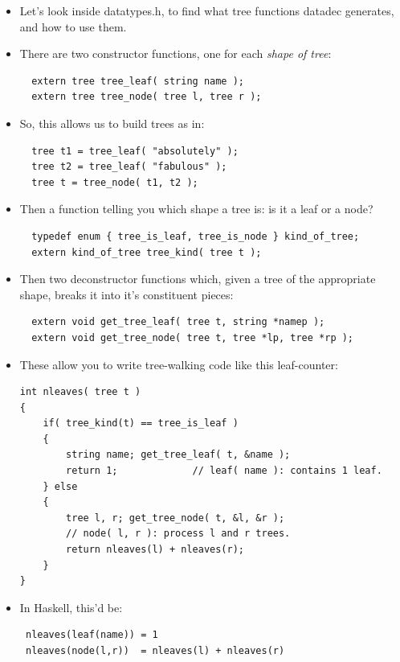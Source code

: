 \documentclass[aspectratio=169]{beamer}
\newcommand{\pitem}{\pause \item}
\begin{document}
\begin{frame}[fragile]
    \begin{itemize}
    \item
      Let's look inside \alert{datatypes.h},
      to find what \alert{tree} functions \alert{datadec} generates, and how to
      use them.
    \pitem
      There are two \alert{constructor functions}, one for each {\em shape of tree}:
\begin{verbatim}
  extern tree tree_leaf( string name );
  extern tree tree_node( tree l, tree r );
\end{verbatim}

    \pitem
      So, this allows us to build trees as in:
\begin{verbatim}
  tree t1 = tree_leaf( "absolutely" );
  tree t2 = tree_leaf( "fabulous" );
  tree t = tree_node( t1, t2 );
\end{verbatim}

    \pitem
      Then a function telling you \alert{which shape a tree is}:
      is it a leaf or a node?
\begin{verbatim}
  typedef enum { tree_is_leaf, tree_is_node } kind_of_tree;
  extern kind_of_tree tree_kind( tree t );
\end{verbatim}

    \pitem
      Then two \alert{deconstructor functions} which, given a tree of the
      appropriate shape, breaks it into it's constituent pieces:
\begin{verbatim}
  extern void get_tree_leaf( tree t, string *namep );
  extern void get_tree_node( tree t, tree *lp, tree *rp );
\end{verbatim}
\end{itemize}

\end{frame}


\begin{frame}[fragile]
    \begin{itemize}
    \item
     These allow you to write \alert{tree-walking} code like this leaf-counter:
\small
\begin{verbatim}
int nleaves( tree t )
{
    if( tree_kind(t) == tree_is_leaf )
    {
        string name; get_tree_leaf( t, &name );
        return 1;             // leaf( name ): contains 1 leaf.
    } else
    {
        tree l, r; get_tree_node( t, &l, &r );
        // node( l, r ): process l and r trees.
        return nleaves(l) + nleaves(r);
    }
}
\end{verbatim}
\small

   \item
 In Haskell, this'd be:
\begin{verbatim}
 nleaves(leaf(name)) = 1
 nleaves(node(l,r))  = nleaves(l) + nleaves(r)
\end{verbatim}

\end{itemize}
\end{frame}
\end{document}
